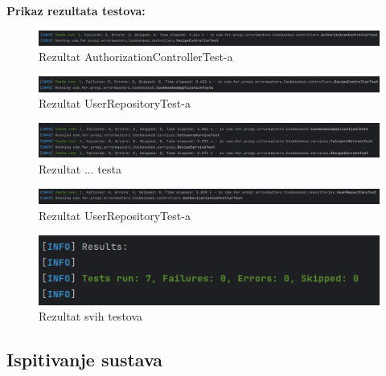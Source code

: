 			\noindent\textbf{Prikaz rezultata testova:}
			\begin{figure}[H]
				\includegraphics[scale=0.38]{slike/test_auth_con_res.png}
				\centering
				\caption{Rezultat AuthorizationControllerTest-a}
				\label{fig:authconres}
			\end{figure}
			\begin{figure}[H]
				\includegraphics[scale=0.4]{slike/test_rec_con_res.png}
				\centering
				\caption{Rezultat UserRepositoryTest-a}
				\label{fig:recconres}
			\end{figure}
			\begin{figure}[H]
				\includegraphics[scale=0.4]{slike/test_three_res.png}
				\centering
				\caption{Rezultat ... testa}
				\label{fig:threeres}
			\end{figure}
			\begin{figure}[H]
				\includegraphics[scale=0.4]{slike/test_user_repo_res.png}
				\centering
				\caption{Rezultat UserRepositoryTest-a}
				\label{fig:userrepores}
			\end{figure}
			\begin{figure}[H]
				\includegraphics[scale=0.4]{slike/test_all_res.png}
				\centering
				\caption{Rezultat svih testova}
				\label{fig:allres}
			\end{figure}
			\eject




			
			\subsection{Ispitivanje sustava}
			
